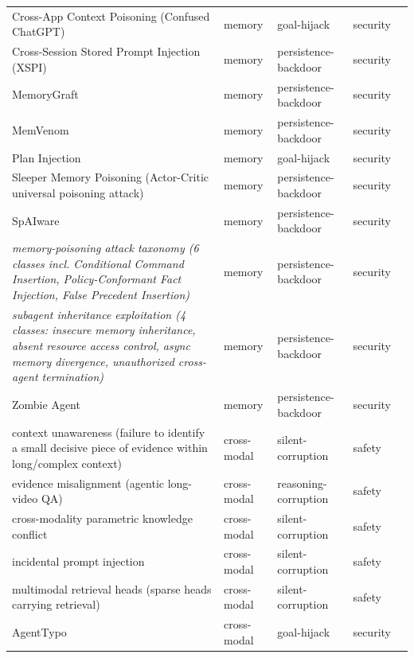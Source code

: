 \begin{longtable}{@{}>{\raggedright\arraybackslash}p{}llll@{}}
Cross-App Context Poisoning (Confused ChatGPT) & memory & goal-hijack & security & \cite{wang-2026-confused} \\
Cross-Session Stored Prompt Injection (XSPI) & memory & persistence-backdoor & security & \cite{xie-2026-prompt} \\
MemoryGraft & memory & persistence-backdoor & security & \cite{srivastava-2025-memorygraft} \\
MemVenom & memory & persistence-backdoor & security & \cite{zhang-2026-memvenom} \\
Plan Injection & memory & goal-hijack & security & \cite{patlan-2025-context} \\
Sleeper Memory Poisoning (Actor-Critic universal poisoning attack) & memory & persistence-backdoor & security & \cite{pulipaka-2026-hidden} \\
SpAIware & memory & persistence-backdoor & security & \cite{rehberger-2024-trust} \\
\emph{memory-poisoning attack taxonomy (6 classes incl. Conditional Command Insertion, Policy-Conformant Fact Injection, False Precedent Insertion)} & memory & persistence-backdoor & security & \cite{dash-2026-untrusted} \\
\emph{subagent inheritance exploitation (4 classes: insecure memory inheritance, absent resource access control, async memory divergence, unauthorized cross-agent termination)} & memory & persistence-backdoor & security & \cite{cai-2026-child} \\
Zombie Agent & memory & persistence-backdoor & security & \cite{yang-2026-zombie} \\
context unawareness (failure to identify a small decisive piece of evidence within long/complex context) & cross-modal & silent-corruption & safety & \cite{xu-2026-contextaware} \\
evidence misalignment (agentic long-video QA) & cross-modal & reasoning-corruption & safety & \cite{qiu-2026-videoseal} \\
cross-modality parametric knowledge conflict & cross-modal & silent-corruption & safety & \cite{zhu-2024-unraveling} \\
incidental prompt injection & cross-modal & silent-corruption & safety & \cite{clusmann-2024-pen} \\
multimodal retrieval heads (sparse heads carrying retrieval) & cross-modal & silent-corruption & safety & \cite{li-2026-retrieval} \\
AgentTypo & cross-modal & goal-hijack & security & \cite{li-2025-agenttypo} \\

\end{longtable}
